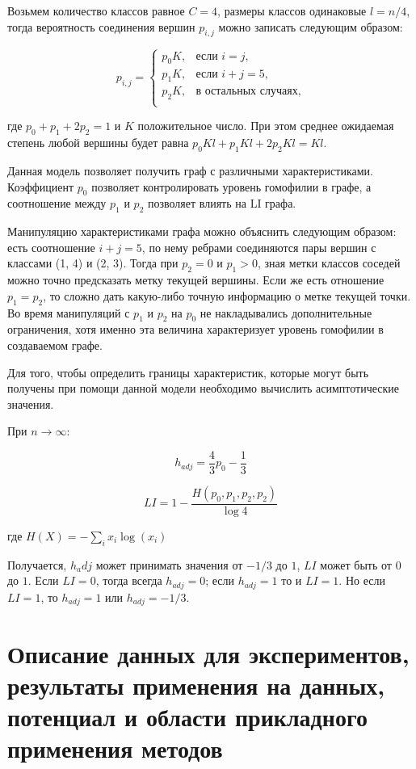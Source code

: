 \documentclass[a4paper,14pt]{article}
\begin{document}
	Возьмем  количество классов равное $C=4$, размеры классов одинаковые $l=n/4$, тогда вероятность соединения вершин $p_{i,j}$ можно записать следующим образом:
	
	$$p_{i,j} = \begin{cases}
		p_0K, & \text{если } i = j,\\
		p_1K, & \text{если } i + j = 5,\\
		p_2K, & \text{в остальных случаях},\\
	\end{cases}$$
	
	где $p_0+p_1+2p_2=1$ и $K$ положительное число.
	При этом среднее ожидаемая степень любой вершины будет равна $p_0 Kl+p_1 Kl+2p_2 Kl=Kl$.
	
	Данная модель позволяет получить граф с различными характеристиками.
	Коэффициент $p_0$ позволяет контролировать уровень гомофилии в графе, а соотношение между $p_1$ и $p_2$ позволяет влиять на LI графа.
	
	Манипуляцию характеристиками графа можно объяснить следующим образом: есть соотношение $i+j=5$, по нему ребрами соединяются пары вершин с классами (1, 4) и (2, 3).
	Тогда при $p_2=0$ и $p_1>0$, зная метки классов соседей можно точно предсказать метку текущей вершины.
	Если же есть отношение $p_1=p_2$, то сложно дать какую-либо точную информацию о метке текущей точки.
	Во время манипуляций с $p_1$ и $p_2$  на $p_0$ не накладывались дополнительные ограничения, хотя именно эта величина характеризует уровень гомофилии в создаваемом графе.
	
	Для того, чтобы определить границы характеристик, которые могут быть получены при помощи данной модели необходимо вычислить асимптотические значения.
	
	При $n \rightarrow \infty$:
	
	$$h_{adj} = \dfrac{4}{3}p_0 - \dfrac{1}{3}$$
	
	$$LI = 1 - \dfrac{H(p_0,p_1,p_2,p_2)}{\log 4}$$
	
	где $H(X) = -\sum_ix_i\log(x_i)$
	
	Получается, $h_adj$ может принимать значения от $-1/3$ до $1$, $LI$ может быть от $0$ до $1$. Если $LI=0$, тогда всегда $h_{adj}=0$; если $h_{adj}=1$ то и $LI=1$.
	Но если $LI=1$, то $h_{adj}=1$ или $h_{adj}=-1/3$.
	
	\pagebreak
	\section{Описание данных для экспериментов, результаты применения на данных, потенциал и области прикладного применения методов}
	\setcounter{figure}{0}
	
\end{document}

